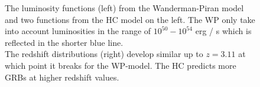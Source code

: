 \begin{figure}[ht]
    \hfill
{}
    \caption{The luminosity functions (left) from the
Wanderman-Piran model and two functions from the HC model on the left. The WP
only take into account luminosities in the range of $10^{50} - 10^{54}$ erg / s
which is reflected in the shorter blue line.\\
The redshift distributions (right) develop similar up to $z=3.11$ at which point
it breaks for the WP-model. The HC predicts more GRBs at higher redshift
values.}
\label{fig:wp_hc_comp}
\end{figure}


